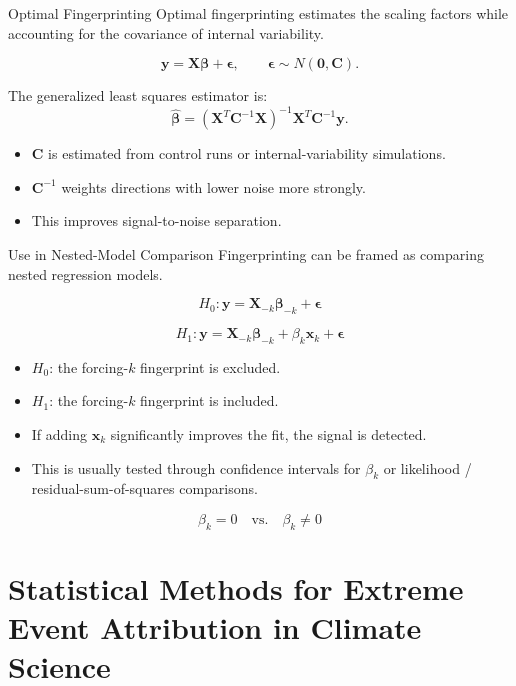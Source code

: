 \documentclass[aspectratio=169]{beamer}
\begin{document}
\begin{frame}{Optimal Fingerprinting}
\small
Optimal fingerprinting estimates the scaling factors while accounting for the covariance of internal variability.

\[
  \mathbf{y}
  =
  \mathbf{X}\boldsymbol{\beta}
  +
  \boldsymbol{\epsilon},
  \qquad
  \boldsymbol{\epsilon}\sim N(\mathbf{0},\mathbf{C}).
\]

The generalized least squares estimator is:
\[
  \hat{\boldsymbol{\beta}}
  =
  (\mathbf{X}^{T}\mathbf{C}^{-1}\mathbf{X})^{-1}
  \mathbf{X}^{T}\mathbf{C}^{-1}\mathbf{y}.
\]

\begin{itemize}
  \item $\mathbf{C}$ is estimated from control runs or internal-variability simulations.
  \item $\mathbf{C}^{-1}$ weights directions with lower noise more strongly.
  \item This improves signal-to-noise separation.
\end{itemize}
\end{frame}

\begin{frame}{Use in Nested-Model Comparison}
\small
Fingerprinting can be framed as comparing nested regression models.

\[
  H_0: \mathbf{y} = \mathbf{X}_{-k}\boldsymbol{\beta}_{-k} + \boldsymbol{\epsilon}
\]

\[
  H_1: \mathbf{y} = \mathbf{X}_{-k}\boldsymbol{\beta}_{-k}
  + \beta_k \mathbf{x}_k + \boldsymbol{\epsilon}
\]

\begin{itemize}
  \item $H_0$: the forcing-$k$ fingerprint is excluded.
  \item $H_1$: the forcing-$k$ fingerprint is included.
  \item If adding $\mathbf{x}_k$ significantly improves the fit, the signal is detected.
  \item This is usually tested through confidence intervals for $\beta_k$ or likelihood / residual-sum-of-squares comparisons.
\end{itemize}

\[
  \beta_k = 0
  \quad \text{vs.} \quad
  \beta_k \ne 0
\]
\end{frame}

\section{Statistical Methods for Extreme Event Attribution in Climate Science}
\end{document}
